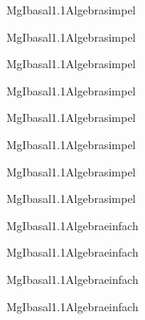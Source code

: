 \documentclass[12pt]{article}
\begin{document}
\begin{Add}{MgI}{basal1.1}{Algebra}{simpel}
\solution{ }
\end{Add}
\begin{Add}{MgI}{basal1.1}{Algebra}{simpel}
\end{Add}

\begin{Add}{MgI}{basal1.1}{Algebra}{simpel}
\solution{ }
\end{Add}
\begin{Add}{MgI}{basal1.1}{Algebra}{simpel}
\end{Add}

\begin{Add}{MgI}{basal1.1}{Algebra}{simpel}
\solution{ }
\end{Add}
\begin{Add}{MgI}{basal1.1}{Algebra}{simpel}
\end{Add}

\begin{Add}{MgI}{basal1.1}{Algebra}{simpel}
\solution{ }
\end{Add}
\begin{Add}{MgI}{basal1.1}{Algebra}{simpel}
\end{Add}

\begin{Add}{MgI}{basal1.1}{Algebra}{einfach}
\solution{ }
\end{Add}
\begin{Add}{MgI}{basal1.1}{Algebra}{einfach}
\end{Add}

\begin{Add}{MgI}{basal1.1}{Algebra}{einfach}
\solution{ }
\end{Add}
\begin{Add}{MgI}{basal1.1}{Algebra}{einfach}
\end{Add}
\end{document}
